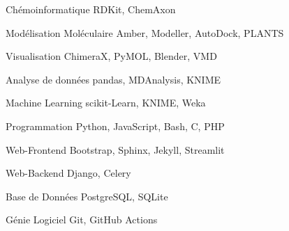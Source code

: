 \vspace{4pt}

\begin{cvskills}


    \cvskill
	{Chémoinformatique}
    {RDKit, ChemAxon}

    \cvskill
	{Modélisation Moléculaire}
    {Amber, Modeller, AutoDock, PLANTS}

    \cvskill
	{Visualisation}
    {ChimeraX, PyMOL, Blender, VMD}


    \cvskill
	{Analyse de données}
    {pandas, MDAnalysis, KNIME}

    \cvskill
	{Machine Learning}
    {scikit-Learn, KNIME, Weka}


	\cvskill
	{Programmation}
    {Python, JavaScript, Bash, C, PHP}

	\cvskill
    {Web-Frontend}
    {Bootstrap, Sphinx, Jekyll, Streamlit}

    \cvskill
    {Web-Backend}
    {Django, Celery}

	\cvskill
    {Base de Données}
    {PostgreSQL, SQLite}

	\cvskill
    {Génie Logiciel}
    {Git, GitHub Actions}

\end{cvskills}
